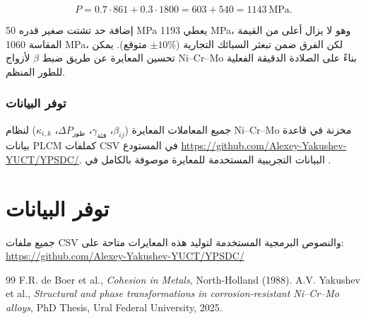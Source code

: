 \documentclass[12pt,a4paper]{article}
\begin{document}
	\[
	P = 0.7\cdot861 + 0.3\cdot1800 = 603 + 540 = 1143\ \text{MPa}.
	\]
	
	إضافة حد تشتت صغير قدره 50 MPa يعطي 1193 MPa، وهو لا يزال أعلى من القيمة المقاسة 1060 MPa، لكن الفرق ضمن تبعثر السبائك التجارية (\(\pm10\%\) متوقع). يمكن تحسين المعايرة عن طريق ضبط \(\beta\) لأزواج Ni–Cr–Mo بناءً على الصلادة الدقيقة الفعلية للطور المنظم.
	
	\subsubsection{توفر البيانات}
	جميع المعاملات المعايرة (\(\beta_{ij}\)، \(\gamma_{\text{فئة}}\)، \(\Delta P_{\text{طور}}\)، \(\kappa_{i,k}\)) لنظام Ni–Cr–Mo مخزنة في قاعدة بيانات PLCM كملفات CSV في المستودع \url{https://github.com/Alexey-Yakushev-YUCT/YPSDC/}. البيانات التجريبية المستخدمة للمعايرة موصوفة بالكامل في \cite{dis2025}.
	
	
	\section{توفر البيانات}
	جميع ملفات CSV والنصوص البرمجية المستخدمة لتوليد هذه المعايرات متاحة على:
	\url{https://github.com/Alexey-Yakushev-YUCT/YPSDC/}
	
	\begin{thebibliography}{99}
		 F.R. de Boer et al., \emph{Cohesion in Metals}, North-Holland (1988).
		 A.V. Yakushev et al., \emph{Structural and phase transformations in corrosion‑resistant Ni–Cr–Mo alloys}, PhD Thesis, Ural Federal University, 2025.
	\end{thebibliography}
	
\end{document}
